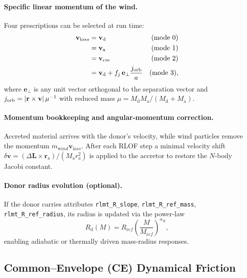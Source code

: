 \documentclass[11pt]{article}
\begin{document}
\paragraph{Specific linear momentum of the wind.}
Four prescriptions can be selected at run time:
\begin{subequations}\label{eq:joptions}
\begin{align}
\mathbf v_{\mathrm loss} &= \mathbf v_{\mathrm d} & (\text{mode }0)\\
                         &= \mathbf v_{\mathrm a} & (\text{mode }1)\\
                         &= \mathbf v_{\mathrm cm}& (\text{mode }2)\\
                         &= \mathbf v_{\mathrm d} + f_j\,\mathbf e_\perp 
                            \frac{j_{\rm orb}}{a} & (\text{mode }3),
\end{align}
\end{subequations}
where $\mathbf e_\perp$ is any unit vector orthogonal to the separation
vector and $j_{\rm orb}=|\mathbf r\times\mathbf v|\,\mu^{-1}$
with reduced mass $\mu=M_{\mathrm d}M_{\mathrm a}/(M_{\mathrm d}+M_{\mathrm a})$.

\paragraph{Momentum bookkeeping and angular‑momentum correction.}
Accreted material arrives with the donor’s velocity, while wind
particles remove the momentum $m_{\mathrm wind}\mathbf v_{\mathrm loss}$.
After each RLOF step a minimal
velocity shift
\(
\delta\mathbf v=(\Delta\mathbf L\times\mathbf r_{\mathrm a})/(M_{\mathrm a}r_{\mathrm a}^2)
\)
is applied to the accretor to restore the $N$‑body Jacobi constant.

\paragraph{Donor radius evolution (optional).}
If the donor carries attributes
\texttt{rlmt\_R\_slope}, \texttt{rlmt\_R\_ref\_mass},
\texttt{rlmt\_R\_ref\_radius}, its radius is updated via the power‑law
\[
R_{\mathrm d}(M)=R_{\mathrm ref}
\left(\frac{M}{M_{\mathrm ref}}\right)^{\alpha_R},
\]
enabling adiabatic or thermally driven mass‑radius responses.

\subsection{Common–Envelope (CE) Dynamical Friction}
\label{sec:ce_drag}
\end{document}
